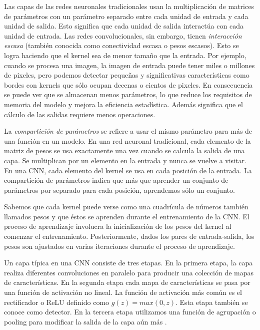 Las capas de las redes neuronales tradicionales usan la multiplicación de matrices de parámetros con
un parámetro separado entre cada unidad de entrada y cada unidad de salida. Esto significa que cada 
unidad de salida interactúa con cada unidad de entrada. Las redes convolucionales, sin embargo, 
tienen \textit{interacción escasa} (también conocida como 
conectividad escasa o pesos escasos). Esto se logra haciendo que el kernel sea de menor
tamaño que la entrada. Por ejemplo, cuando se procesa una imagen, la imagen de entrada puede tener 
miles o millones de pixeles, pero podemos detectar pequeñas y significativas características como
bordes con kernels que sólo ocupan decenas o cientos de pixeles. En consecuencia se puede ver
que se almacenan menos parámetros, lo que reduce los requisitos de memoria del modelo 
y mejora la eficiencia estadística. Además significa que el cálculo de las salidas requiere menos 
operaciones.

La \textit{compartición de parámetros} se refiere a usar el mismo parámetro para más de una función
en un modelo. En una red neuronal tradicional, cada elemento de la matriz de pesos se usa 
exactamente una vez cuando se calcula la salida de una capa. Se multiplican por un elemento en la 
entrada y nunca se vuelve a visitar. En una CNN, cada elemento del kernel se usa en cada posición de la
entrada. La compartición de parámetros indica que más que aprender un conjunto de parámetros 
por separado para cada posición, aprendemos sólo un conjunto. 


Sabemos que cada kernel puede verse como una cuadrícula de números también llamados pesos
y que éstos se aprenden durante el entrenamiento de la CNN. El proceso de aprendizaje involucra 
la inicialización de los pesos del kernel al comenzar el entrenamiento. Posteriormente, dados los pares
de entrada-salida, los pesos son ajustados en varias iteraciones durante el proceso de aprendizaje.\\

\begin{remark}
Un capa típica en una CNN consiste de tres etapas. En la 
primera etapa, la capa realiza diferentes convoluciones en
paralelo para producir una colección de mapas de
características. En la segunda etapa cada mapa 
de características se pasa por una función de activación
no lineal. La función de activación más común es el 
rectificador o ReLU definido como $g(z) = max(0, z)$.
Esta etapa también se conoce como detector.
En la tercera etapa utilizamos una función de agrupación
o pooling para modificar la salida de la capa aún más \cite{iangoodfellowyoshuabengioaaroncourville2017}.\\
\end{remark}


